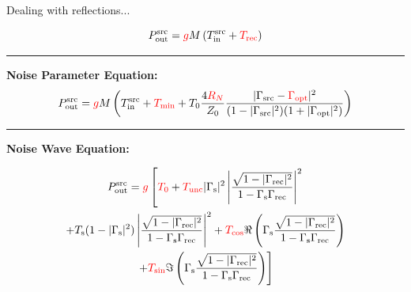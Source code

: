 \documentclass[aspectratio=169]{beamer}
\begin{document}
\begin{frame}{\small{Dealing with reflections...}}

	{\tiny
		\begin{equation}
			P_{\text{out}}^{\text{src}} = \textcolor{red}{g} M \left( T_{\text{in}}^{\text{src}} + \textcolor{red}{T_{\text{rec}}} \right)
		\end{equation}
	}

	\vspace{0.3cm}
	\hrule  %
	\vspace{0.3cm}

	\textbf{\small{Noise Parameter Equation:}}
	{\tiny
		\begin{equation}
			P_{\text{out}}^{\text{src}} = \textcolor{red}{g} M \left( T_{\text{in}}^{\text{src}} + \textcolor{red}{T_{\text{min}}} + T_0 \frac{4\textcolor{red}{R_N}}{Z_0} \frac{|\Gamma_{\text{src}} - \textcolor{red}{\Gamma_{\text{opt}}}|^2}{(1 - |\Gamma_{\text{src}}|^2)(1 + |\Gamma_{\text{opt}}|^2)} \right)
		\end{equation}
	}

	\vspace{0.3cm}
	\hrule  %
	\vspace{0.3cm}

	\textbf{\small{Noise Wave Equation:}}

	{\tiny
		\begin{multline}\label{}
			P_{\text{out}}^{\text{src}} = \textcolor{red}{g} \left[ \textcolor{red}{T_0} + \textcolor{red}{T_{\text{unc}}} |\Gamma_{\text{s}}|^2 \left|\frac{ \sqrt{1 - |\Gamma_{\text{rec}}|^2}}{1 - \Gamma_{\text{s}}\Gamma_{\text{rec}}} \right|^2 \right. \\
				\left. + T_{\text{s}}(1 - |\Gamma_{\text{s}}|^2) \left|\frac{ \sqrt{1 - |\Gamma_{\text{rec}}|^2}}{1 - \Gamma_{\text{s}}\Gamma_{\text{rec}}} \right|^2 + \textcolor{red}{T_{\text{cos}}} \Re \left( \Gamma_{\text{s}} \frac{\sqrt{1 - |\Gamma_{\text{rec}}|^2}}{1 - \Gamma_{\text{s}} \Gamma_{\text{rec}}} \right) \right. \\
				\left. + \textcolor{red}{T_{\text{sin}}} \Im \left( \Gamma_{\text{s}} \frac{\sqrt{1 - |\Gamma_{\text{rec}}|^2}}{1 - \Gamma_{\text{s}} \Gamma_{\text{rec}}} \right) \right]
		\end{multline}
	}

\end{frame}
\end{document}

